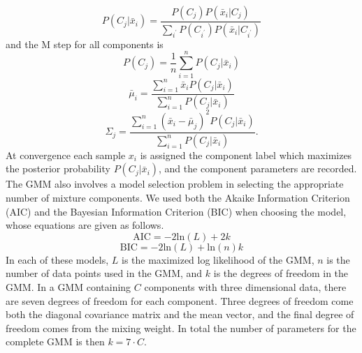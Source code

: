 \documentclass{article}
\begin{document}
\begin{equation}
P(C_j|\bar{x}_i) = \frac{P(C_j)P(\bar{x}_i|C_j)}{\sum_{i^{'}}P(C_{i^{'}})P(\bar{x}_i|C_{i^{'}})}
\end{equation}
and the M step for all components is
\begin{equation}
P(C_j) = \frac{1}{n}\sum_{i=1}^nP(C_j|\bar{x}_i) 
\end{equation}
\begin{equation}
\bar{\mu}_i = \frac{\sum_{i=1}^n\bar{x}_iP(C_j|\bar{x}_i)}{\sum_{i=1}^n P(C_j|\bar{x}_i)} 
\end{equation}
\begin{equation}
\Sigma_j = \frac{\sum_{i=1}^n(\bar{x}_i - 
\bar{\mu}_j)^2P(C_j|\bar{x}_i)}{\sum_{i=1}^n P(C_j|\bar{x}_i)}.
\end{equation}
At convergence each sample $x_i$ is assigned the component label which maximizes the posterior probability $P(C_j|\bar{x}_i)$, and the component parameters are recorded. 
\newline
\indent
The GMM also involves a model selection problem in selecting the appropriate number of mixture components. We used both the Akaike Information Criterion (AIC) and the Bayesian Information Criterion (BIC) when choosing the model, whose equations are given as follows.
\begin{equation}
\text{AIC} = -2\text{ln}(L) + 2k
\end{equation}
\begin{equation}
\text{BIC} = -2\text{ln}(L) + \text{ln}(n)k
\end{equation}
In each of these models, $L$ is the maximized log likelihood of the GMM, $n$ is the number of data points used in the GMM, and $k$ is the degrees of freedom in the GMM. In a GMM containing $C$ components with three dimensional data, there are seven degrees of freedom for each component. Three degrees of freedom come both the diagonal covariance matrix and the mean vector, and the final degree of freedom comes from the mixing weight. In total the number of parameters for the complete GMM is then $k = 7 \cdot C$.
\end{document}
